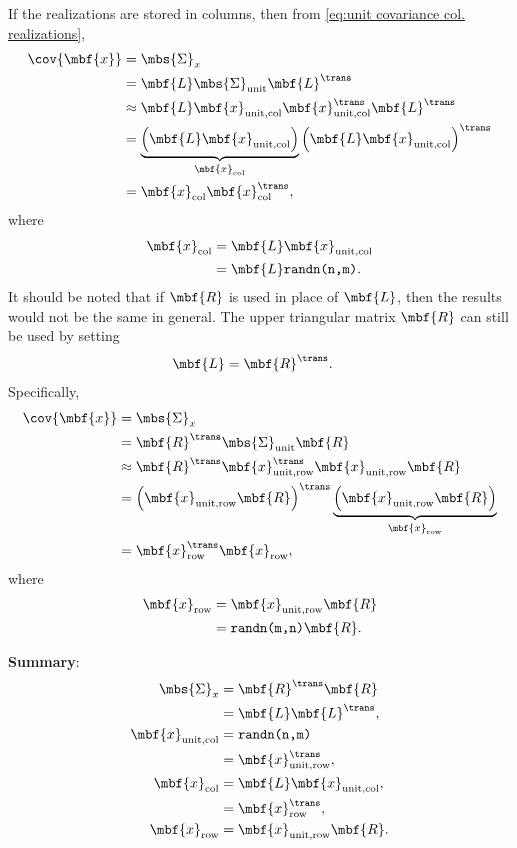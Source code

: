 If the realizations are stored in columns, then from \eqref{eq:unit covariance col. realizations}, 
\begin{align}
    \cov{\mbf{x}}
    &= \mbs{\Sigma}_{x}\\
    &=  \mbf{L}\mbs{\Sigma}_{\mathrm{unit}}\mbf{L}^{\trans}\\
    &\approx \mbf{L}\mbf{x}_{\mathrm{unit,col}}\mbf{x}_{\mathrm{unit,col}}^{\trans}\mbf{L}^{\trans}\\
    &= \underbrace{\left(\mbf{L}\mbf{x}_{\mathrm{unit,col}}\right)}_{\mbf{x}_{\mathrm{col}}}\left(\mbf{L}\mbf{x}_{\mathrm{unit, col}}\right)^{\trans}\\
    &= \mbf{x}_{\mathrm{col}}\mbf{x}_{\mathrm{col}}^{\trans},
\end{align}
where
\begin{align}
    \mbf{x}_{\mathrm{col}} &= \mbf{L}\mbf{x}_{\mathrm{unit, col}}\\
    &= \mbf{L}\texttt{randn(n,m)}.
\end{align}
It should be noted that if $\mbf{R}$ is used in place of $\mbf{L}$, then the results would not be the same in general. The upper triangular matrix $\mbf{R}$ can still be used by setting
\begin{align}
    \mbf{L} &= \mbf{R}^{\trans}.
\end{align}
Specifically,
\begin{align}
    \cov{\mbf{x}}
    &= \mbs{\Sigma}_{x}\\
    &=  \mbf{R}^{\trans}\mbs{\Sigma}_{\mathrm{unit}}\mbf{R}\\
    &\approx \mbf{R}^{\trans}\mbf{x}_{\mathrm{unit,row}}^{\trans}\mbf{x}_{\mathrm{unit,row}}\mbf{R}\\
    &= \left(\mbf{x}_{\mathrm{unit, row}}\mbf{R}\right)^{\trans}\underbrace{\left(\mbf{x}_{\mathrm{unit,row}}\mbf{R}\right)}_{\mbf{x}_{\mathrm{row}}}\\
    &= \mbf{x}_{\mathrm{row}}^{\trans}\mbf{x}_{\mathrm{row}},
\end{align}
where
\begin{align}
    \mbf{x}_{\mathrm{row}} &= \mbf{x}_{\mathrm{unit, row}}\mbf{R}\\
    &= \texttt{randn(m,n)}\mbf{R}.
\end{align}


\begin{myBlueBox}
    \textbf{Summary}: 
    \begin{align}
        \mbs{\Sigma}_{x} &= \mbf{R}^{\trans}\mbf{R}\\
        &= \mbf{L}\mbf{L}^{\trans},\\
        \mbf{x}_{\mathrm{unit, col}} &= \texttt{randn(n,m)}\\
        &= \mbf{x}_{\mathrm{unit, row}}^{\trans},\\
        \mbf{x}_{\mathrm{col}} &= \mbf{L}\mbf{x}_{\mathrm{unit, col}},\\
        &= \mbf{x}_{\mathrm{row}}^{\trans},\\
        \mbf{x}_{\mathrm{row}}&= \mbf{x}_{\mathrm{unit, row}}\mbf{R}.
    \end{align}
\end{myBlueBox}

